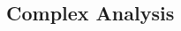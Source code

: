 
\newpage
\subsection{Complex Analysis}%
\label{sub:Complex Analysis}

\begin{multicols}{3}


    \MulticolsBreak

    \MulticolsPhantomPlaceholder

    \MulticolsBreak

    \MulticolsPhantomPlaceholder

\end{multicols}

